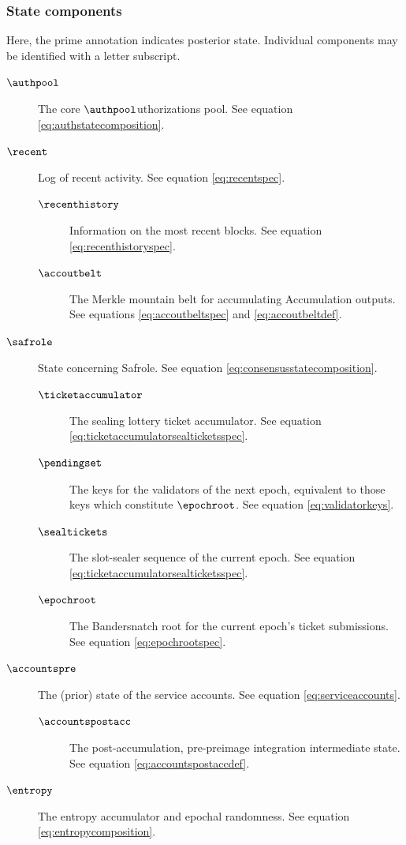 \subsubsection{State components}

Here, the prime annotation indicates posterior state. Individual components may be identified with a letter subscript.
\begin{description}
  \item[$\authpool$] The core $\authpool$uthorizations pool. See equation \ref{eq:authstatecomposition}.
  \item[$\recent$] Log of recent activity. See equation \ref{eq:recentspec}.
  \begin{description}
    \item[$\recenthistory$] Information on the most recent blocks. See equation \ref{eq:recenthistoryspec}.
    \item[$\accoutbelt$] The Merkle mountain belt for accumulating Accumulation outputs. See equations \ref{eq:accoutbeltspec} and \ref{eq:accoutbeltdef}.
  \end{description}
  \item[$\safrole$] State concerning Safrole. See equation \ref{eq:consensusstatecomposition}.
  \begin{description}
    \item[$\ticketaccumulator$] The sealing lottery ticket accumulator. See equation \ref{eq:ticketaccumulatorsealticketsspec}.
    \item[$\pendingset$] The keys for the validators of the next epoch, equivalent to those keys which constitute $\epochroot$. See equation \ref{eq:validatorkeys}.
    \item[$\sealtickets$] The slot-sealer sequence of the current epoch. See equation \ref{eq:ticketaccumulatorsealticketsspec}.
    \item[$\epochroot$] The Bandersnatch root for the current epoch's ticket submissions. See equation \ref{eq:epochrootspec}.
  \end{description}
  \item[$\accountspre$] The (prior) state of the service accounts. See equation \ref{eq:serviceaccounts}.
  \begin{description}
    \item[$\accountspostacc$] The post-accumulation, pre-preimage integration intermediate state. See equation \ref{eq:accountspostaccdef}.
  \end{description}
  \item[$\entropy$] The entropy accumulator and epochal randomness. See equation \ref{eq:entropycomposition}.

\end{description}
